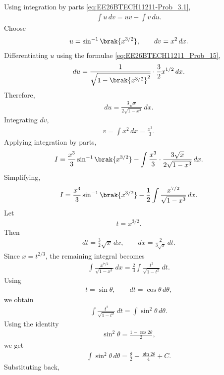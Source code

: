 \begin{enumerate}[label=\thesubsection.\arabic*, ref=\thesubsection.\theenumi]
\solution
Using integration by parts \eqref{eq:EE26BTECH11211-Prob_3.1},
\begin{align}
\int u\,dv=uv-\int v\,du.
\end{align}
Choose
\begin{align}
u=\sin^{-1}\brak{x^{3/2}},
\qquad dv=x^2\,dx.
\end{align}
Differentiating $u$ using the formulae \eqref{eq:EE26BTECH11211_Prob_15},
\begin{align}
du=\frac{1}{\sqrt{1-\brak{x^{3/2}}^2}}
\cdot\frac{3}{2}x^{1/2}\,dx.
\end{align}
Therefore,
\begin{align}
du=\frac{3\sqrt{x}}{2\sqrt{1-x^3}}\,dx.
\end{align}
Integrating $dv$,
\begin{align}
v=\int x^2\,dx=\frac{x^3}{3}.
\end{align}
Applying integration by parts,
\begin{align}
I=\frac{x^3}{3}\sin^{-1}\brak{x^{3/2}}
-\int\frac{x^3}{3}
\cdot\frac{3\sqrt{x}}{2\sqrt{1-x^3}}\,dx.
\end{align}
Simplifying,
\begin{align}
I=\frac{x^3}{3}\sin^{-1}\brak{x^{3/2}}
-\frac{1}{2}\int\frac{x^{7/2}}{\sqrt{1-x^3}}\,dx.
\end{align}
Let
\begin{align}
t=x^{3/2}.
\end{align}
Then
\begin{align}
dt=\frac{3}{2}\sqrt{x}\,dx,
\qquad
dx=\frac{2}{3\sqrt{x}}\,dt.
\end{align}
Since $x=t^{2/3}$, the remaining integral becomes
\begin{align}
\int\frac{x^{7/2}}{\sqrt{1-x^3}}\,dx
=\frac{2}{3}\int\frac{t^2}{\sqrt{1-t^2}}\,dt.
\end{align}
Using
\begin{align}
t=\sin\theta,
\qquad dt=\cos\theta\,d\theta,
\end{align}
we obtain
\begin{align}
\int\frac{t^2}{\sqrt{1-t^2}}\,dt
=\int\sin^2\theta\,d\theta.
\end{align}
Using the identity
\begin{align}
\sin^2\theta=\frac{1-\cos 2\theta}{2},
\end{align}
we get
\begin{align}
\int\sin^2\theta\,d\theta
=\frac{\theta}{2}-\frac{\sin 2\theta}{4}+C.
\end{align}
Substituting back,

\end{enumerate}
